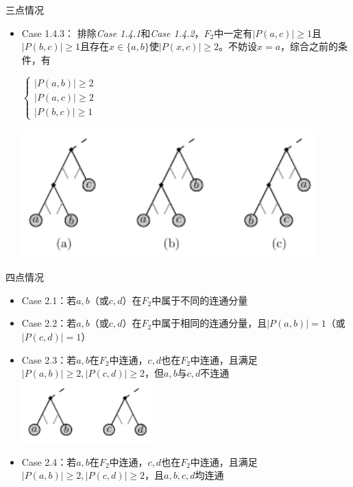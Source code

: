 \documentclass[slidestop,compress,mathserif,red]{beamer}
\begin{document}
\begin{frame}{三点情况}
\begin{itemize}
  \item Case 1.4.3：  排除\textit{Case 1.4.1}和\textit{Case 1.4.2}，$F_2$中一定有$|P(a,c)| \ge 1$且$|P(b,c)| \ge 1$且存在$x \in \{a,b\}$使$|P(x,c)| \ge 2$。不妨设$x=a$，综合之前的条件，有
        \begin{center}
        $\left\{
        \begin{array}{l}
          |P(a,b)| \ge 2\\
          |P(a,c)| \ge 2\\
          |P(b,c)| \ge 1
        \end{array}
        \right.$
        \end{center}

  \includegraphics[width=0.9\textwidth, height=0.7\textheight, keepaspectratio]{./pic/case_1_4_3.pdf}

\end{itemize}
\end{frame}

\begin{frame}{四点情况}
  \begin{itemize}
    \item Case 2.1：若$a,b$（或$c,d$）在$F_2$中属于不同的连通分量
    \pause
    \item Case 2.2：若$a,b$（或$c,d$）在$F_2$中属于相同的连通分量，且$|P(a,b)|=1$（或$|P(c,d)|=1$）
    \pause
    \item Case 2.3：若$a,b$在$F_2$中连通，$c,d$也在$F_2$中连通，且满足$|P(a,b)| \ge 2,|P(c,d)| \ge 2$，但$a,b$与$c,d$不连通\\
    \includegraphics[width=0.4\textwidth, height=0.5\textheight, keepaspectratio]{./pic/case_2_3.pdf}
    \pause
    \item Case 2.4：若$a,b$在$F_2$中连通，$c,d$也在$F_2$中连通，且满足$|P(a,b)| \ge 2,|P(c,d)| \ge 2$，且$a,b,c,d$均连通\\
    
  \end{itemize}
\end{frame}
\end{document}
